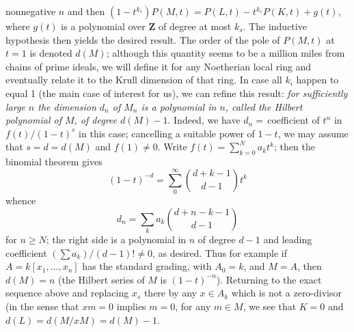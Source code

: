 \documentclass[10pt]{article}
\begin{document}
nonnegative $n$ and then $(1-t^{k_s})P(M,t) = P(L,t) - t^{k_s}P(K,t) +
g(t)$, where $g(t)$ is a polynomial over $\mathbf Z$ of degree at most
$k_s$. The inductive hypothesis then yields the desired result. The
order of the pole of $P(M,t)$ at $t=1$ is denoted $d(M)$; although this
quantity seems to be a million miles from chains of prime ideals, we
will define it for any Noetherian local ring and eventually relate it to
the Krull dimension of that ring. In case all $k_i$ happen to equal 1
(the main case of interest for us), we can refine this result: {\sl for
  sufficiently large $n$ the dimension $d_n$ of $M_n$ is a polynomial in
  $n$, called the Hilbert polynomial of $M$, of degree $d(M) - 1$}.
Indeed, we have $d_n =\,$coefficient of $t^n$ in $f(t)/(1-t)^s$ in this
case; cancelling a suitable power of $1-t$, we may assume that $s = d =
d(M)$ and $f(1)\ne0$. Write $f(t) = \sum_{k=0}^N a_k t^k$; then the
binomial theorem gives
$$(1-t)^{-d} = \sum_0^\infty {d+k-1\choose d-1} t^k$$
whence
$$ d_n = \sum_k a_k {d+n-k-1\choose d-1}$$
\noindent for $n\ge N$; the right side is a polynomial in $n$ of degree
$d-1$ and leading coefficient $(\sum a_k)/(d-1)!\ne0$, as desired. Thus
for example if $A=k[x_1,\ldots,x_n]$ has the standard grading, with $A_0
= k$, and $M=A$, then $d(M) = n$ (the Hilbert series of $M$ is
$(1-t)^{-n}$). Returning to the exact sequence above and replacing $x_s$
there by any $x\in A_k$ which is not a zero-divisor (in the sense that
$xm = 0$ implies $m=0$, for any $m\in M$, we see that $K=0$ and $d(L) =
d(M/xM) = d(M) - 1$.
\end{document}
